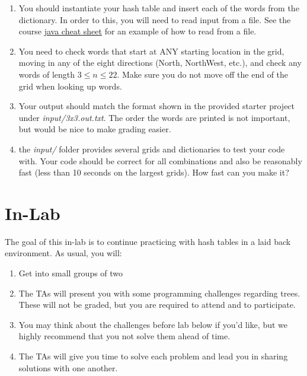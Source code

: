 \documentclass[paper=a4, fontsize=11pt, parskip=full]{scrartcl} %
\numberwithin{equation}{section} %
\numberwithin{figure}{section} %
\numberwithin{table}{section} %
\begin{document}
\begin{enumerate}
	\item You should instantiate your hash table and insert each of the words from the dictionary. In order to this, you will need to read input from a file. See the course \href{https://markfloryan.github.io/dsa1/java/javaCheatSheet/javaCheatSheet.pdf}{java cheat sheet} for an example of how to read from a file.
	\item You need to check words that start at ANY starting location in the grid, moving in any of the eight directions (North, NorthWest, etc.), and check any words of length $3 \leq n \leq 22$. Make sure you do not move off the end of the grid when looking up words.
	\item Your output should match the format shown in the provided starter project under \emph{input/3x3.out.txt}. The order the words are printed is not important, but would be nice to make grading easier.
	\item the \emph{input/} folder provides several grids and dictionaries to test your code with. Your code should be correct for all combinations and also be reasonably fast (less than 10 seconds on the largest grids). How fast can you make it?
\end{enumerate}


\newpage
\section{In-Lab}

The goal of this in-lab is to continue practicing with hash tables in a laid back environment. As usual, you will:

\begin{enumerate}
	\item Get into small groups of two
	\item The TAs will present you with some programming challenges regarding trees. These will not be graded, but you are required to attend and to participate.
	\item You may think about the challenges before lab below if you'd like, but we highly recommend that you not solve them ahead of time.
	\item The TAs will give you time to solve each problem and lead you in sharing solutions with one another.
\end{enumerate}
\end{document}
